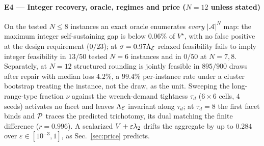 \paragraph*{E4 --- Integer recovery, oracle, regimes and price ($N{=}12$ unless stated)}
On the tested $N\le8$ instances an exact oracle enumerates \emph{every} $|\mathcal A|^N$ map:
the maximum integer self-sustaining gap is below $0.06\%$ of $V^{\star}$, with no false
positive at the design requirement ($0/23$); at $\sigma=0.97\Lambda_{\mathcal{E}}$ relaxed feasibility fails to
imply integer feasibility in $13/50$ tested $N{=}6$ instances and in $0/50$ at $N{=}7,8$.
Separately, at $N=12$ structured rounding is jointly feasible in $895/900$ draws after repair
with median loss $4.2\%$, a $99.4\%$ per-instance rate under a cluster bootstrap treating the
instance, not the draw, as the unit. Sweeping the long-range-type fraction $\nu$ against the wrench-demand tightness $\tau_d$
($6\times6$ cells, $4$ seeds) activates no facet and leaves $\Lambda_{\mathcal{E}}$ invariant along $\tau_d$;
at $\tau_d=8$ the first facet binds and $\mathcal{P}$ traces the predicted trichotomy, its dual
matching the finite difference ($r=0.996$). A scalarized $V+\varepsilon\lambda_2$ drifts the
aggregate by up to $0.284$ over $\varepsilon\in[10^{-3},1]$, as Sec.~\ref{sec:price} predicts.
